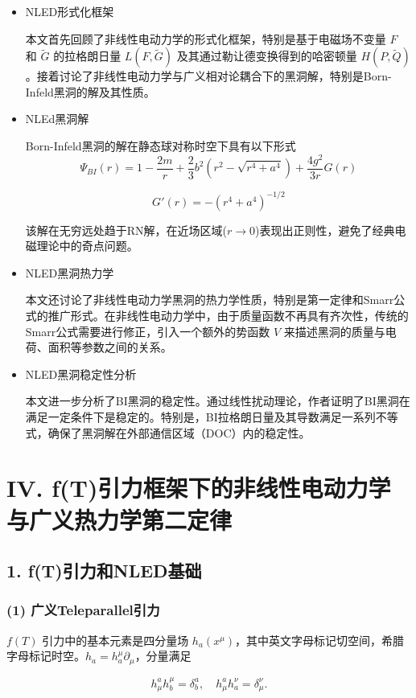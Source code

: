 \documentclass[aps,prl,preprint,groupedaddress,showkeys]{revtex4-2}
\begin{document}
\begin{itemize}
    \item NLED形式化框架

本文首先回顾了非线性电动力学的形式化框架，特别是基于电磁场不变量 $F$ 和 $\tilde{G}$ 的拉格朗日量 $L(F,\tilde{G})$ 及其通过勒让德变换得到的哈密顿量 $H(P,\tilde{Q})$。接着讨论了非线性电动力学与广义相对论耦合下的黑洞解，特别是Born-Infeld黑洞的解及其性质。
    \item NLEd黑洞解
    
    Born-Infeld黑洞的解在静态球对称时空下具有以下形式
$$
\Psi_{BI}(r)
=1-\frac{2m }{r } + \frac{2 }{3 } b^2\left(r^2-\sqrt{r^4+a^4} \right) + \frac{4g^2 }{3r } G(r)
$$

$$
G'(r)
=-\left(r^4+a^4 \right)^{-1/2}
$$

该解在无穷远处趋于RN解，在近场区域($r\to 0$)表现出正则性，避免了经典电磁理论中的奇点问题。
    \item NLED黑洞热力学

    本文还讨论了非线性电动力学黑洞的热力学性质，特别是第一定律和Smarr公式的推广形式。在非线性电动力学中，由于质量函数不再具有齐次性，传统的Smarr公式需要进行修正，引入一个额外的势函数 $V$ 来描述黑洞的质量与电荷、面积等参数之间的关系。

    \item NLED黑洞稳定性分析

    本文进一步分析了BI黑洞的稳定性。通过线性扰动理论，作者证明了BI黑洞在满足一定条件下是稳定的。特别是，BI拉格朗日量及其导数满足一系列不等式，确保了黑洞解在外部通信区域（DOC）内的稳定性。
\end{itemize}

\section{IV. f(T)引力框架下的非线性电动力学与广义热力学第二定律}

\subsection{1. f(T)引力和NLED基础}

\subsubsection{(1) 广义Teleparallel引力}

$f(T)$ 引力中的基本元素是四分量场 $h_a(x^\mu)$，其中英文字母标记切空间，希腊字母标记时空。$h_a=h_a^\mu\partial_\mu$，分量满足

$$
h_\mu^a h_b^\mu = \delta_b^a,\quad h_\mu^a h_a^\nu = \delta_\mu^\nu.
$$
\end{document}
